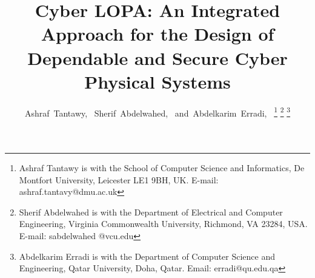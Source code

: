 \documentclass[journal]{IEEEtran}
\begin{document}
%
\title{Cyber LOPA: An Integrated Approach for the Design of Dependable and Secure Cyber Physical Systems}
%
%
%

\author{Ashraf~Tantawy,~
    Sherif~Abdelwahed,~
    and~Abdelkarim~Erradi,~%
\thanks{Ashraf Tantawy is with the School of Computer Science and Informatics, De Montfort University, Leicester LE1 9BH, UK. E-mail: ashraf.tantavy@dmu.ac.uk}%
\thanks{Sherif Abdelwahed is with the Department of Electrical and Computer Engineering, Virginia Commonwealth University, Richmond, VA 23284, USA. E-mail: sabdelwahed @vcu.edu}
\thanks{Abdelkarim Erradi is with the Department of Computer Science and Engineering, Qatar University, Doha, Qatar. Email: erradi@qu.edu.qa}%
}
{\let\newpage\relax\maketitle}
% 
%
\end{document}
